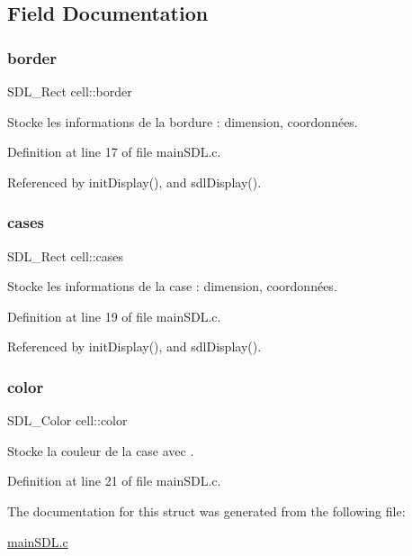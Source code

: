 \subsection{Field Documentation}
\mbox{\label{structcell_ae289d5dfc43a03b47de6dffa417776df}} 
\subsubsection{\texorpdfstring{border}{border}}
{\footnotesize\ttfamily S\+D\+L\+\_\+\+Rect cell\+::border}



Stocke les informations de la bordure \+: dimension, coordonnées. 



Definition at line 17 of file main\+S\+D\+L.\+c.



Referenced by init\+Display(), and sdl\+Display().

\mbox{\label{structcell_af2fb9745b37f309905e02fed903748a5}} 
\subsubsection{\texorpdfstring{cases}{cases}}
{\footnotesize\ttfamily S\+D\+L\+\_\+\+Rect cell\+::cases}



Stocke les informations de la case \+: dimension, coordonnées. 



Definition at line 19 of file main\+S\+D\+L.\+c.



Referenced by init\+Display(), and sdl\+Display().

\mbox{\label{structcell_a17634ccb0012ada2dc1f042314d35c21}} 
\subsubsection{\texorpdfstring{color}{color}}
{\footnotesize\ttfamily S\+D\+L\+\_\+\+Color cell\+::color}



Stocke la couleur de la case avec . 



Definition at line 21 of file main\+S\+D\+L.\+c.



The documentation for this struct was generated from the following file\+:\begin{DoxyCompactItemize}
\item 
\hyperlink{mainSDL_8c}{main\+S\+D\+L.\+c}\end{DoxyCompactItemize}
